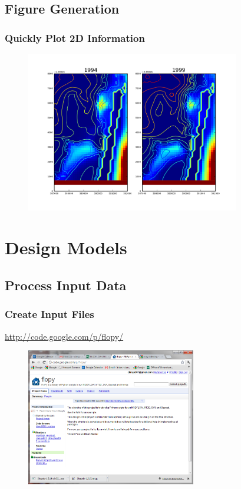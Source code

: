 \documentclass[t]{beamer}
\begin{document}
\subsection{Figure Generation}
\begin{frame}[fragile]
\frametitle{Quickly Plot 2D Information}
  \begin{figure}[ht]
  \centering
         \includegraphics[height=7cm]{figures/hds_concs.png}
   \end{figure}
\end{frame}



\section{Design Models}
\subsection{Process Input Data}

\begin{frame}[fragile]
\frametitle{Create Input Files}
\url{http://code.google.com/p/flopy/}
  \begin{figure}[ht]
  \centering
         \includegraphics[height=6cm]{figures/flopy.png}
   \end{figure}
\end{frame}
\end{document}
